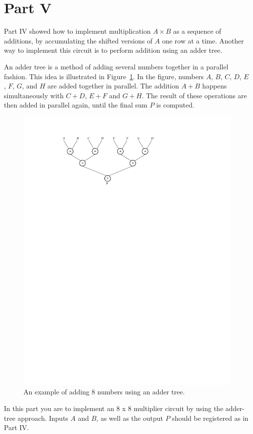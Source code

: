 \documentclass[epsfig,10pt,fullpage]{article}
\newcommand{\CommonDocsPath}{../../../common/docs}
\begin{document}
\section*{Part V}
Part IV showed how to implement multiplication $A \times B$ as a sequence of additions, 
by accumulating the shifted versions of $A$ one row at a time. Another way to implement 
this circuit is to perform addition using an adder tree.

An adder tree is a method of adding several numbers together in a parallel fashion. This 
idea is illustrated in Figure~\ref{fig:adder_tree}. In the figure, numbers 
$A$, $B$, $C$, $D$, $E$, $F$, $G$, and $H$ are added together in parallel.
The addition $A + B$ happens simultaneously with $C + D$, $E + F$ and $G + H$. The 
result of these operations are then added in parallel
again, until the final sum $P$ is computed.

\begin{figure}[H]
\centerline{
\includegraphics{figures/adder_tree}}
\caption{An example of adding 8 numbers using an adder tree.}
\label{fig:adder_tree}
\end{figure}

In this part you are to implement an 8 {\sf x} 8 multiplier circuit by using the adder-tree
approach. Inputs $A$ and $B$, as well as the output $P$ should be registered as in Part IV. 



\end{document}
